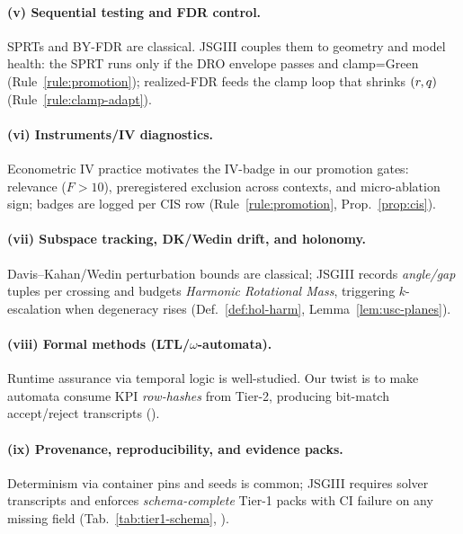 \paragraph{(v) Sequential testing and FDR control.}
SPRTs and BY-FDR are classical. JSGIII couples them to geometry and model health: the SPRT runs only if the DRO envelope passes and clamp=Green (Rule~\ref{rule:promotion}); realized-FDR feeds the clamp loop that shrinks $(r,q)$ (Rule~\ref{rule:clamp-adapt}).

\paragraph{(vi) Instruments/IV diagnostics.}
Econometric IV practice motivates the IV-badge in our promotion gates: relevance ($F>10$), preregistered exclusion across contexts, and micro-ablation sign; badges are logged per CIS row (Rule~\ref{rule:promotion}, Prop.~\ref{prop:cis}).

\paragraph{(vii) Subspace tracking, DK/Wedin drift, and holonomy.}
Davis–Kahan/Wedin perturbation bounds are classical; JSGIII records \emph{angle/gap} tuples per crossing and budgets \emph{Harmonic Rotational Mass}, triggering $k$-escalation when degeneracy rises (Def.~\ref{def:hol-harm}, Lemma~\ref{lem:usc-planes}).

\paragraph{(viii) Formal methods (LTL/$\omega$-automata).}
Runtime assurance via temporal logic is well-studied. Our twist is to make automata consume KPI \emph{row-hashes} from Tier-2, producing bit-match accept/reject transcripts ().

\paragraph{(ix) Provenance, reproducibility, and evidence packs.}
Determinism via container pins and seeds is common; JSGIII requires solver transcripts and enforces \emph{schema-complete} Tier-1 packs with CI failure on any missing field (Tab.~\ref{tab:tier1-schema}, ).

